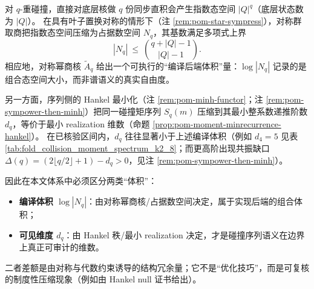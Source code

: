 
\begin{remark}\label{rem:pom-compile-volume-vs-visible-dimension}
对 \(q\)-重碰撞，直接对底层核做 \(q\) 份同步直积会产生指数态空间 \(|Q|^q\)（底层状态数为 \(|Q|\)）。
在具有叶子置换对称的情形下（注 \ref{rem:pom-star-sympress}），对称群取商把指数态空间压缩为占据数空间 \(N_q\)，其基数满足多项式上界
\[
|N_q|\ \le\ \binom{q+|Q|-1}{|Q|-1}.
\]
相应地，对称幂商核 \(\widetilde A_q\) 给出一个可执行的“编译后端体积”量：\(\log|N_q|\) 记录的是组合态空间大小，而非谱语义的真实自由度。
\par
另一方面，序列侧的 Hankel 最小化（注 \ref{rem:pom-minh-functor}；注 \ref{rem:pom-sympower-then-minh}）把同一碰撞矩序列 \(S_q(m)\) 压缩到其最小整系数递推阶数 \(d_q\)，等价于最小 realization 维数（命题 \ref{prop:pom-moment-minrecurrence-hankel}）。
在已核验区间内，\(d_q\) 往往显著小于上述编译体积（例如 \(d_4=5\) 见表 \ref{tab:fold_collision_moment_spectrum_k2_8}；而更高阶出现共振缺口 \(\Delta(q)=(2\lfloor q/2\rfloor+1)-d_q>0\)，见注 \ref{rem:pom-sympower-then-minh}）。
\par
因此在本文体系中必须区分两类“体积”：
\begin{itemize}
  \item \textbf{编译体积 \(\log|N_q|\)}：由对称幂商核/占据数空间决定，属于实现后端的组合体积；
  \item \textbf{可见维度 \(d_q\)}：由 Hankel 秩/最小 realization 决定，才是碰撞序列语义在边界上真正可审计的维数。
\end{itemize}
二者差额是由对称与代数约束诱导的结构冗余量；它不是“优化技巧”，而是可复核的制度性压缩现象（例如由 Hankel null 证书给出）。
\end{remark}

